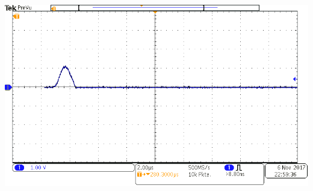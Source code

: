 %
\begin{center}
    \begin{adjustbox}{max width=\linewidth, keepaspectratio}
        \includegraphics[]{png/tek00007}
    \end{adjustbox}
    \label{fig:}
\end{center}
%
